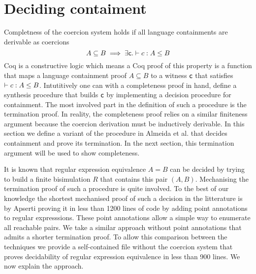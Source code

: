\documentclass[a4paper,UKenglish,cleveref, autoref, thm-restate]{lipics-v2021}
\begin{document}
\section{Deciding contaiment}
Completness of the coercion system holds if all language containments are derivable as coercions
\[ A \subseteq B \implies \exists \dslcom{c}.\contains{}{c}{A}{B}\]
Coq is a constructive logic which means a Coq proof of this property is a function that maps a language containment proof $A \subseteq B$ to a witness $\textsf{c}$ that satisfies $\contains{}{c}{A}{B}$. Intutitively one can with a completeness proof in hand, define a synthesis procedure that builds $\textsf{c}$ by implementing a decision procedure for containment. The most involved part in the definition of such a procedure is the termination proof. In reality, the completeness proof relies on a similar finiteness argument because the coercion derivation must be inductively derivable. In this section we define a variant of the procedure in Almeida et al. \cite{AMR09} that decides containment and prove its termination. In the next section, this termination argument will be used to show completeness.

It is known that regular expression equivalence $A = B$ can be decided by trying to build a finite bisimulation $R$ that contains this pair $(A,B)$. 
Mechanising the termination proof of such a procedure is quite involved. To the best of our knowledge the shortest mechanised proof of such a decision in the litterature is by Apserti \cite{A12} proving it in less than 1200 lines of code by adding point annotations to regular expresssions. These point annotations allow a simple way to enumerate all reachable pairs. We take a similar approach without point annotations that admits a shorter termination proof. To allow this comparison between the techniques we provide a self-contained file without the coercion system that proves decidability of regular expression equivalence in less than 900 lines. We now explain the approach.

\end{document}
